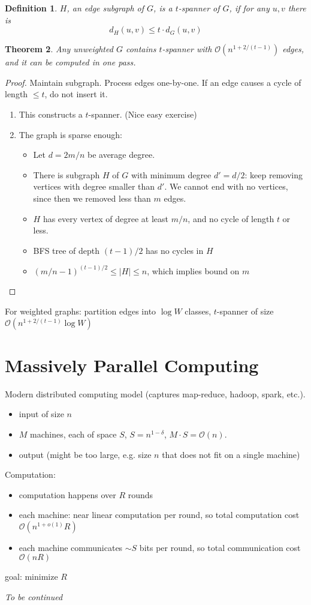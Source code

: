 \documentclass[11pt]{article}
\newtheorem{theorem}{Theorem}
\newtheorem{definition}[theorem]{Definition}
\newcommand{\bigo}{\mathcal{O}}
\begin{document}
\begin{definition}
$H$, an edge subgraph of $G$, is a $t$-spanner of $G$, if for any $u,v$ there is
$$d_H(u,v) \le t \cdot d_G(u,v)$$
\end{definition}

\begin{theorem}
Any unweighted $G$ contains $t$-spanner with $\bigo(n^{1+2/(t-1)})$ edges, and it can be computed in one pass.
\end{theorem}
\begin{proof}
Maintain subgraph. Process edges one-by-one. If an edge causes a cycle of length $\le t$, do not insert it.
\begin{enumerate}
\item This constructs a $t$-spanner. (Nice easy exercise)
\item The graph is sparse enough:
\begin{itemize}
\item Let $d = 2m/n$ be average degree.
\item There is subgraph $H$ of $G$ with minimum degree $d' = d/2$: keep removing vertices with degree smaller than $d'$. We cannot end with no vertices, since then we removed less than $m$ edges.
\item $H$ has every vertex of degree at least $m/n$, and no cycle of length $t$ or less.
\item BFS tree of depth $(t-1)/2$ has no cycles in $H$
\item $(m/n-1)^{(t-1)/2} \le |H| \le n$, which implies bound on $m$
\end{itemize}
\end{enumerate}
\end{proof}

For weighted graphs: partition edges into $\log W$ classes, $t$-spanner of size $\bigo(n^{1+2/(t-1)} \log W)$


\section{Massively Parallel Computing}
Modern distributed computing model (captures map-reduce, hadoop, spark, etc.).

\begin{itemize}
\item input of size $n$
\item $M$ machines, each of space $S$, $S = n^{1-\delta}$, $M \cdot S = \bigo(n)$.
\item output (might be too large, e.g. size $n$ that does not fit on a single machine)
\end{itemize}

Computation:
\begin{itemize}
\item computation happens over $R$ rounds
\item each machine: near linear computation per round, so total computation cost $\bigo(n^{1+o(1)} R)$
\item each machine communicates $\sim S$ bits per round, so total communication cost $\bigo(n R)$
\end{itemize}
goal: minimize $R$


\emph{To be continued}
\end{document}
